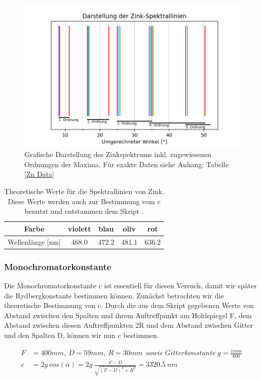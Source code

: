 \documentclass[]{article}
\begin{document}
\begin{figure}[H]
\centering
\includegraphics[width=.9\linewidth]{Plots/Zink_Linien.png}
\caption{ Grafische Darstellung des Zinkspektrums inkl. zugewiesenen Ordnungen der Maxima. Für exakte Daten siehe Anhang: Tabelle \ref{Zn Data} }
\label{fig:Zink}
\end{figure}

\begin{table}[H]
	\centering
	\begin{tabular}{c|c|c|c|c}
		Farbe & violett & blau & oliv  & rot \\
		\hline
		Wellenlänge [nm]  & 468.0 & 472.2 & 481.1 & 636.2 \\
	\end{tabular}
	\caption{Theoretische Werte für die Spektrallinien von Zink. Diese Werte werden auch zur Bestimmung vom c benutzt und entstammen dem Skript \cite{skript}.}
\end{table}

\subsubsection{Monochromatorkonstante}
Die Monochromatorkonstante c ist essentiell für diesen Versuch, damit wir später die Rydbergkonstante bestimmen  können. Zunächst betrachten wir die theoretische Bestimmung von c. Durch die aus dem Skript gegebenen Werte von Abstand zwischen den Spalten und ihrem Auftreffpunkt am Hohlspiegel F, dem Abstand zwischen diesen Auftreffpunkten 2R und dem Abstand zwischen Gitter und den Spalten D, können wir nun c bestimmen. 

\begin{align}
F&= 400mm ,\: D= 59mm ,\: R=30mm \:\: sowie \: Gitterkonstante \: g=\frac{1mm}{600} \\
c&= 2g\: cos(\alpha) = 2g\: \frac{F-D}{\sqrt{(F-D)^2 + R^2}} = 3320.5\:nm
\end{align}
\end{document}
